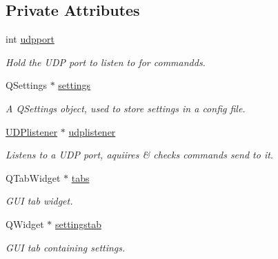 \subsection*{Private Attributes}
\begin{DoxyCompactItemize}
\item 
\mbox{\label{classcagecontrol_ae73f9b22e1cc81ef92d900b8c63b4663}} 
int \hyperlink{classcagecontrol_ae73f9b22e1cc81ef92d900b8c63b4663}{udpport}
\begin{DoxyCompactList}\small\item\em Hold the U\+DP port to listen to for commandds. \end{DoxyCompactList}\item 
\mbox{\label{classcagecontrol_aaa56b3d1bbf35785c21c5465eef48185}} 
Q\+Settings $\ast$ \hyperlink{classcagecontrol_aaa56b3d1bbf35785c21c5465eef48185}{settings}
\begin{DoxyCompactList}\small\item\em A Q\+Settings object, used to store settings in a config file. \end{DoxyCompactList}\item 
\mbox{\label{classcagecontrol_a6c281db6d7f0de7964c49bac0d5823b7}} 
\hyperlink{classUDPlistener}{U\+D\+Plistener} $\ast$ \hyperlink{classcagecontrol_a6c281db6d7f0de7964c49bac0d5823b7}{udplistener}
\begin{DoxyCompactList}\small\item\em Listens to a U\+DP port, aquiires \& checks commands send to it. \end{DoxyCompactList}\item 
\mbox{\label{classcagecontrol_abc80d835c69ca52a62f18c341c2bd009}} 
Q\+Tab\+Widget $\ast$ \hyperlink{classcagecontrol_abc80d835c69ca52a62f18c341c2bd009}{tabs}
\begin{DoxyCompactList}\small\item\em G\+UI tab widget. \end{DoxyCompactList}\item 
\mbox{\label{classcagecontrol_a5350ebcf40a0c709af82276e6ce2284d}} 
Q\+Widget $\ast$ \hyperlink{classcagecontrol_a5350ebcf40a0c709af82276e6ce2284d}{settingstab}
\begin{DoxyCompactList}\small\item\em G\+UI tab containing settings. \end{DoxyCompactList}\item 

\end{DoxyCompactItemize}
